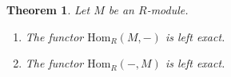 \documentclass{amsart}[12pt]
\def\image{\operatorname{im}}
\def\im{\image}
\def\ker{\operatorname{ker}}
\newcommand{\Hom}{\mathrm{Hom}}
\newcommand{\Sept}[1]{\textcolor{violet}{Lecture of September #1, 2021}}
\numberwithin{equation}{section}
\theoremstyle{plain} %
\newtheorem{thm}[equation]{Theorem}
\theoremstyle{definition}
\theoremstyle{remark}
\newcommand{\xra}[1]{\xrightarrow{#1}}
\begin{document}
\begin{thm} Let $M$ be an $R$-module.
\begin{enumerate}
\item The functor $\Hom_R(M,-)$ is left exact.
\item The functor $\Hom_R(-,M)$ is left exact.
\end{enumerate}
\end{thm}
\begin{comment}

\Sept{20}
\begin{proof} 
\begin{enumerate}
\item Let \[ 0 \to A \xra{i} B \xra{p} C\]
be  exact. We need to show that
\[ 0 \to \Hom_R(M,A) \xra{i_*} \Hom_R(M,B) \xra{p_*} \Hom_R(M,C)\]
is exact.
\begin{itemize}
\item $i_*$ is injective: Let $f\in \Hom_R(M,A)$ be nonzero, so $f(m)\neq 0$ for some $m\in M$. Then $i_*(f)(m) = i(f(m))\neq 0$ since $i$ is injective, so $i_*(f)\in \Hom_R(M,B)$ is nonzero.
\item $\im(i_*)\subseteq \ker(p_*)$: Let $g\in \Hom_R(M,B)$ be in the image of $i_*$, so we can write $g=i_*(f)$ for some $f\in \Hom_R(M,A)$. We have $p_*(i_*(f))=p\circ i \circ f=0$.
\item $\ker(p_*)\subseteq\im(i_*)$: Let $g\in \Hom_R(M,B)$ be in the kernel of $p_*$, so $p\circ g=0$. Then, for every $m\in M$, $g(m)\in \ker(p) = \im(i)$. As $i$ is injective, $i$ induces an isomorphism from $i$ to the image of $A$ in $B$, so there is an $R$-module homomorphism $q:\im(A) \to A$ such that $i \circ q=1_{\im(A)}$. Thus, we obtain an $R$-module map $f:= q\circ g :M\to A$ such that $i_*(f) = i \circ q \circ g = g$.
\end{itemize}
\item Let \[ A \xra{i} B \xra{p} C \to 0\]
be  exact. We need to show that
\[ 0 \to \Hom_R(C,M)\xra{p^*}  \Hom_R(B,M) \xra{i^*} \Hom_R(A,M)  \]
is exact.
\begin{itemize}
\item $p^*$ is injective: Let $f\in \Hom_R(C,M)$ be nonzero, so $f(c)\neq 0$ for some $m\in M$. Then, since $p$ is surjective, there is some $b\in B$ such that $p(b)=c$, and hence $p^*(f)(b)=f(p(b))=f(c)\neq 0$, so $p^*(f)\neq 0$.

\item $\im(p^*)\subseteq \ker(i^*)$: Let $g\in \Hom_R(B,M)$ be in the image of $p_*$, so we can write $g=p^*(f)$ for some $f\in \Hom_R(M,C)$. We have $i^*(p^*(f))=f \circ p \circ i=0$.


\end{comment}
\end{document}
